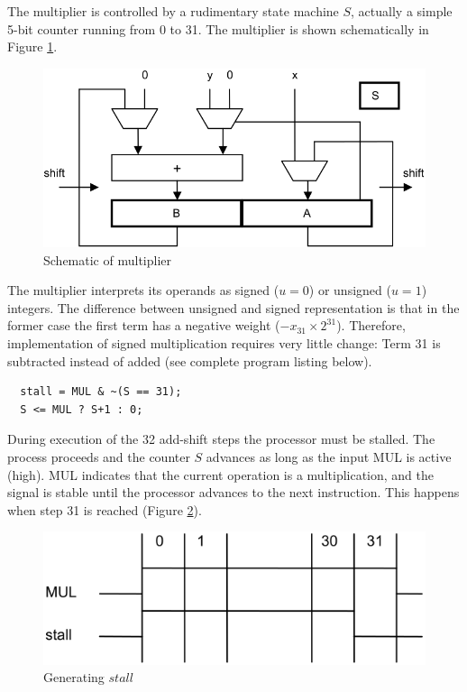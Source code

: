 The multiplier is controlled by a rudimentary state machine $S$, actually a simple 5-bit counter
running from 0 to 31. The multiplier is shown schematically in Figure \ref{fig:multiplier}.

\begin{figure}[h!]
	\centering
	\includegraphics[width=.9\textwidth]{i/F/3.png}
	\caption{Schematic of multiplier}
	\label{fig:multiplier}
\end{figure}

The multiplier interprets its operands as signed ($u = 0$) or unsigned ($u = 1$) integers. The difference
between unsigned and signed representation is that in the former case the first term has a
negative weight ($-x_{31}×2^{31}$). Therefore, implementation of signed multiplication requires very little
change: Term 31 is subtracted instead of added (see complete program listing below).

\begin{verbatim}
  stall = MUL & ~(S == 31);
  S <= MUL ? S+1 : 0;
\end{verbatim}

During execution of the 32 add-shift steps the processor must be stalled. The process proceeds
and the counter $S$ advances as long as the input MUL is active (high). MUL indicates that the
current operation is a multiplication, and the signal is stable until the processor advances to the
next instruction. This happens when step 31 is reached (Figure \ref{fig:stall}).

\begin{figure}[h!]
	\centering
	\includegraphics[width=.9\textwidth]{i/F/4.png}
	\caption{Generating $stall$}
	\label{fig:stall}
\end{figure}

